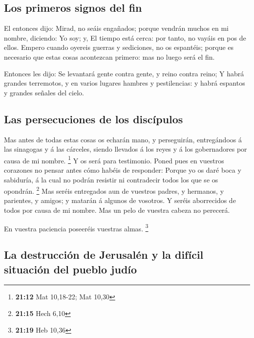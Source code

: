 \hypertarget{los-primeros-signos-del-fin}{%
\subsection{Los primeros signos del
fin}\label{los-primeros-signos-del-fin}}

 El entonces dijo: Mirad, no seáis engañados; porque
vendrán muchos en mi nombre, diciendo: Yo soy; y, El tiempo está cerca:
por tanto, no vayáis en pos de ellos.  Empero cuando
oyereis guerras y sediciones, no os espantéis; porque es necesario que
estas cosas acontezcan primero: mas no luego será el fin.

 Entonces les dijo: Se levantará gente contra gente, y
reino contra reino;  Y habrá grandes terremotos, y en
varios lugares hambres y pestilencias: y habrá espantos y grandes
señales del cielo.

\hypertarget{las-persecuciones-de-los-discuxedpulos}{%
\subsection{Las persecuciones de los
discípulos}\label{las-persecuciones-de-los-discuxedpulos}}

 Mas antes de todas estas cosas os echarán mano, y
perseguirán, entregándoos á las sinagogas y á las cárceles, siendo
llevados á los reyes y á los gobernadores por causa de mi nombre.
\footnote{\textbf{21:12} Mat 10,18-22; Mat 10,30}  Y os
será para testimonio.  Poned pues en vuestros corazones
no pensar antes cómo habéis de responder:  Porque yo os
daré boca y sabiduría, á la cual no podrán resistir ni contradecir todos
los que se os opondrán. \footnote{\textbf{21:15} Hech 6,10}
 Mas seréis entregados aun de vuestros padres, y
hermanos, y parientes, y amigos; y matarán á algunos de vosotros.
 Y seréis aborrecidos de todos por causa de mi nombre.
 Mas un pelo de vuestra cabeza no perecerá.

 En vuestra paciencia poseeréis vuestras almas.
\footnote{\textbf{21:19} Heb 10,36}

\hypertarget{la-destrucciuxf3n-de-jerusaluxe9n-y-la-difuxedcil-situaciuxf3n-del-pueblo-juduxedo}{%
\subsection{La destrucción de Jerusalén y la difícil situación del
pueblo
judío}\label{la-destrucciuxf3n-de-jerusaluxe9n-y-la-difuxedcil-situaciuxf3n-del-pueblo-juduxedo}}

